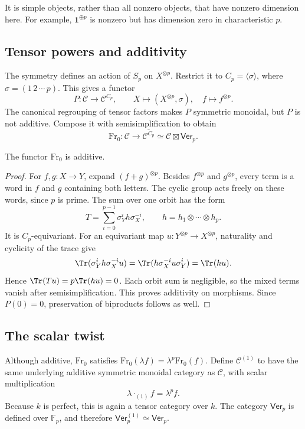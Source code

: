 \begin{remark}
It is simple objects, rather than all nonzero objects, that have nonzero
dimension here. For example, $\mathbf1^{\oplus p}$ is nonzero but has
dimension zero in characteristic $p$.
\end{remark}

\subsection{Tensor powers and additivity}
The symmetry defines an action of $S_p$ on $X^{\otimes p}$. Restrict it to
$C_p=\langle\sigma\rangle$, where $\sigma=(1\,2\,\cdots\,p)$. This gives a
functor
\[
 P:\mathcal C\longrightarrow\mathcal C^{C_p},\qquad
 X\longmapsto(X^{\otimes p},\sigma),\quad f\longmapsto f^{\otimes p}.
\]
The canonical regrouping of tensor factors makes $P$ symmetric monoidal,
but $P$ is not additive. Compose it with semisimplification to obtain
\[
 \mathrm{Fr}_0:\mathcal C\longrightarrow
 \overline{\mathcal C^{C_p}}\simeq
 \mathcal C\boxtimes\mathsf{Ver}_p.
\]

\begin{lemma}\label{lec19-additivity}
The functor $\mathrm{Fr}_0$ is additive.
\end{lemma}
\begin{proof}
For $f,g:X\to Y$, expand $(f+g)^{\otimes p}$. Besides $f^{\otimes p}$ and
$g^{\otimes p}$, every term is a word in $f$ and $g$ containing both letters.
The cyclic group acts freely on these words, since $p$ is prime. The sum
over one orbit has the form
\[
 T=\sum_{i=0}^{p-1}\sigma_Y^i h\sigma_X^{-i},
 \qquad h=h_1\otimes\cdots\otimes h_p.
\]
It is $C_p$-equivariant. For an equivariant map
$u:Y^{\otimes p}\to X^{\otimes p}$, naturality and cyclicity of the trace give
\[
 \Tr(\sigma_Y^i h\sigma_X^{-i}u)
 =\Tr(h\sigma_X^{-i}u\sigma_Y^i)=\Tr(hu).
\]
Hence $\Tr(Tu)=p\Tr(hu)=0$. Each orbit sum is negligible, so the mixed terms
vanish after semisimplification. This proves additivity on morphisms.
Since $P(0)=0$, preservation of biproducts follows as well.
\end{proof}

\subsection{The scalar twist}
Although additive, $\mathrm{Fr}_0$ satisfies
$\mathrm{Fr}_0(\lambda f)=\lambda^p\mathrm{Fr}_0(f)$. Define
$\mathcal C^{(1)}$ to have the same underlying additive symmetric monoidal
category as $\mathcal C$, with scalar multiplication
\[
 \lambda\mathbin{\cdot_{(1)}} f=\lambda^p f.
\]
Because $k$ is perfect, this is again a tensor category over $k$.
The category $\mathsf{Ver}_p$ is defined over $\mathbb F_p$, and therefore
$\mathsf{Ver}_p^{(1)}\simeq\mathsf{Ver}_p$.

